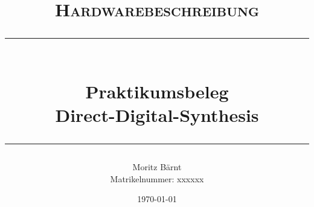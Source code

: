 
\title{ 
    \normalsize \textsc{Hardwarebeschreibung}
    \\[2.0cm]
    \rule{\linewidth}{.5pt}
    \\[.4cm]
    \large \textbf{Praktikumsbeleg}
    \\
    \LARGE \textbf{Direct-Digital-Synthesis}
    \rule{\linewidth}{.5pt}
}

\date{\today}

\author{
    Moritz Bärnt \\
    Matrikelnummer: xxxxxx
}

\maketitle
\tableofcontents

\newpage
